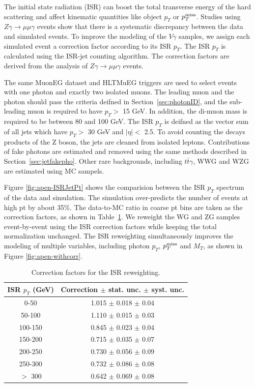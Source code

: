 \documentclass[thesis.tex]{subfiles}
\renewcommand\_{\textunderscore\allowbreak}
\begin{document}
The initial state radiation (ISR) can boost the total transverse energy of the hard scattering and affect kinematic quantities like object $p_T$ or $p_T^\textrm{miss}$. Studies using $Z\gamma\rightarrow\mu\mu\gamma$ events show that there is a systematic discrepancy between the data and simulated events. To improve the modeling of the $V\gamma$ samples, we assign each simulated event a correction factor according to its ISR $p_T$. The ISR $p_T$ is calculated using the ISR-jet counting algorithm. The correction factors are derived from the analysis of $Z\gamma\rightarrow \mu\mu\gamma$ events.

The same MuonEG dataset and HLT\_MuEG triggers are used to select events with one photon and exactly two isolated muons.  The leading muon and the photon should pass the criteria deifned in Section~\ref{sec:photonID}, and the sub-leading muon is required to have $p_T >$ 15 GeV. In addition, the di-muon mass is required to be between 80 and 100 GeV. The ISR $p_T$ is deifned as the vector sum of all jets which have $p_T >$ 30 GeV and $|\eta| <$ 2.5.  To avoid counting the decays products of the Z boson, the jets are cleaned from isolated leptons. Contributions of fake photons are estimated and removed using the same methods described in  Section~\ref{sec:jetfakepho}.  Other rare backgrounds, including $t\bar{t}\gamma$, WWG and WZG are estimated using MC sampels.

Figure \ref{fig:apen-ISRJetPt} shows the comparision between the ISR $p_T$ spectrum of the data and simulation. The simulation over-predicts the number of events at high pt by about 35\%. The data-to-MC ratio in coarse pt bins are taken as the correction factors, as shown in Table~\ref{table:apen-ISR}. We reweight the WG and ZG samples event-by-event using the ISR correction factors while keeping the total normalization unchanged. The ISR reweighting simultaneously improves the modeling of multiple variables, including photon $p_T$, $p_T^\textrm{miss}$ and $M_T$, as shown in Figure \ref{fig:apen-withcorr}.

\begin{table}[htb]
  \centering
  \begin{tabular}{|c|c|}
  \hline
	ISR $p_T$ (GeV)& Correction $\pm$ stat. unc. $\pm$ syst. unc.\\ \hline
  0-50           & 1.015 $\pm$ 0.018 $\pm$ 0.04\\ \hline
  50-100         & 1.110 $\pm$ 0.015 $\pm$ 0.03\\ \hline
  100-150        & 0.845 $\pm$ 0.023 $\pm$ 0.04\\ \hline
  150-200        & 0.715 $\pm$ 0.035 $\pm$ 0.07\\ \hline
  200-250        & 0.730 $\pm$ 0.056 $\pm$ 0.09\\ \hline
  250-300        & 0.732 $\pm$ 0.086 $\pm$ 0.08\\ \hline
  $>$ 300        & 0.642 $\pm$ 0.069 $\pm$ 0.08\\ \hline
  \end{tabular}
  \caption{Correction factors for the ISR reweighting.}
  \label{table:apen-ISR}
\end{table}
\end{document}
